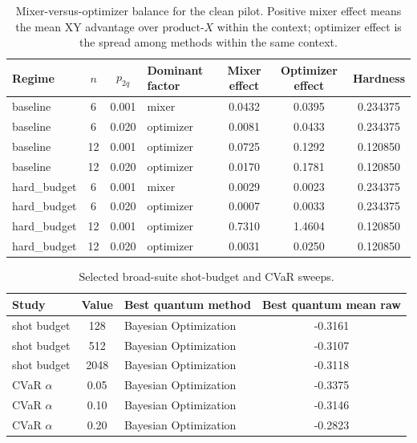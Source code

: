 \documentclass[11pt]{article}
\begin{document}
\begin{table}[H]
\centering
\caption{Mixer-versus-optimizer balance for the clean pilot. Positive mixer effect means the mean \(\mathrm{XY}\) advantage over \(\mathrm{product}\text{-}X\) within the context; optimizer effect is the spread among methods within the same context.}
\label{tab:mixer-balance}
\begin{tabular}{l c c l S[table-format=1.4] S[table-format=1.4] S[table-format=1.6]}
\toprule
Regime & \(n\) & \(p_{2q}\) & Dominant factor & {Mixer effect} & {Optimizer effect} & {Hardness} \\
\midrule
baseline & 6 & 0.001 & mixer & 0.0432 & 0.0395 & 0.234375 \\
baseline & 6 & 0.020 & optimizer & 0.0081 & 0.0433 & 0.234375 \\
baseline & 12 & 0.001 & optimizer & 0.0725 & 0.1292 & 0.120850 \\
baseline & 12 & 0.020 & optimizer & 0.0170 & 0.1781 & 0.120850 \\
hard\_budget & 6 & 0.001 & mixer & 0.0029 & 0.0023 & 0.234375 \\
hard\_budget & 6 & 0.020 & optimizer & 0.0007 & 0.0033 & 0.234375 \\
hard\_budget & 12 & 0.001 & optimizer & 0.7310 & 1.4604 & 0.120850 \\
hard\_budget & 12 & 0.020 & optimizer & 0.0031 & 0.0250 & 0.120850 \\
\bottomrule
\end{tabular}
\end{table}

\begin{table}[H]
\centering
\caption{Selected broad-suite shot-budget and CVaR sweeps.}
\label{tab:shot-cvar}
\begin{tabular}{l c l S[table-format=-1.4]}
\toprule
Study & Value & Best quantum method & {Best quantum mean raw} \\
\midrule
shot budget & 128 & Bayesian Optimization & -0.3161 \\
shot budget & 512 & Bayesian Optimization & -0.3107 \\
shot budget & 2048 & Bayesian Optimization & -0.3118 \\
\midrule
CVaR \(\alpha\) & 0.05 & Bayesian Optimization & -0.3375 \\
CVaR \(\alpha\) & 0.10 & Bayesian Optimization & -0.3146 \\
CVaR \(\alpha\) & 0.20 & Bayesian Optimization & -0.2823 \\
\bottomrule
\end{tabular}
\end{table}
\end{document}
